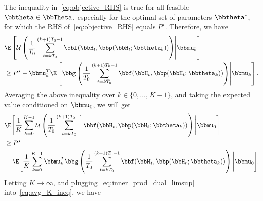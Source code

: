 The inequality in~\eqref{eq:objective_RHS} is true for all feasible $\bbtheta\in\bbTheta$, especially for the optimal set of parameters $\bbtheta^{\star}$, for which the RHS of~\eqref{eq:objective_RHS} equals $P^{\star}$. Therefore, we have
\begin{align}
&\E\left[\mathcal{U}\left( \frac{1}{T_0} \sum_{t=kT_0}^{(k+1)T_0-1} \bbf(\bbH_{t}, \bbp(\bbH_{t};\bbtheta_k)) \right)\middle| \bbmu_{k} \right]\nonumber \\
&\geq P^{\star} - \bbmu_{k}^T \E\left[\bbg\left( \frac{1}{T_0} \sum_{t=kT_0}^{(k+1)T_0-1} \bbf(\bbH_{t}, \bbp(\bbH_{t};\bbtheta_k)) \right)\middle| \bbmu_{k} \right].
\end{align}
Averaging the above inequality over $k\in\{0,\dots,K-1\}$, and taking the expected value conditioned on $\bbmu_0$, we will get
\begin{align}
&\E\Bigg[\frac{1}{K} \sum_{k=0}^{K-1} \mathcal{U}\left( \frac{1}{T_0} \sum_{t=kT_0}^{(k+1)T_0-1} \bbf(\bbH_{t}, \bbp(\bbH_{t};\bbtheta_k)) \right)\Bigg| \bbmu_{0} \Bigg]\nonumber \\
&\geq P^{\star} \nonumber \\
& -\E\Bigg[\frac{1}{K} \sum_{k=0}^{K-1} \bbmu_{k}^T \bbg\left( \frac{1}{T_0} \sum_{t=kT_0}^{(k+1)T_0-1} \bbf(\bbH_{t}, \bbp(\bbH_{t};\bbtheta_k)) \right)\Bigg| \bbmu_{0} \Bigg]\hspace{-1pt}.\label{eq:avg_K_ineq}
\end{align}
Letting $K\to\infty$, and plugging~\eqref{eq:inner_prod_dual_limsup} into~\eqref{eq:avg_K_ineq}, we have
